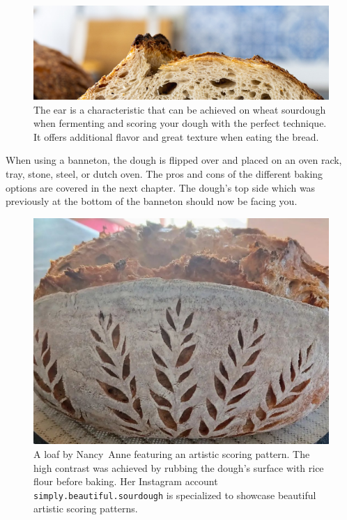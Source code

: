 \begin{figure}[htb!]
  \includegraphics[width=\textwidth]{the-ear}
  \caption[Bread's ear]{The ear is a characteristic that can be achieved on
      wheat sourdough when fermenting and scoring your dough with the perfect
      technique. It offers additional flavor and great texture when eating the
      bread.}%
  \label{fig:the-ear}
\end{figure}

When using a banneton, the dough is flipped over and
placed on an oven rack, tray, stone, steel, or dutch oven. The pros
and cons of the different baking options are covered in the next chapter.
The dough's top side which was previously at the bottom of the
banneton should now be facing you.

\begin{figure}[htb!]
  \includegraphics[width=\textwidth]{artistic-scoring}
  \caption[Artistic scoring]{A loaf by Nancy~Anne featuring an artistic
      scoring pattern.  The high contrast was achieved by rubbing the dough's
      surface with rice flour before baking. Her Instagram account
      \texttt{simply.beautiful.sourdough} is specialized to showcase beautiful
      artistic scoring patterns.}%
  \label{fig:artistic-scoring}
\end{figure}

